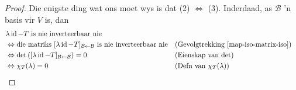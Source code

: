 \documentclass[a4paper,11pt]{book}
\theoremstyle{definition}
\newcommand{\basis}[1]{{\mathcal #1}}
\DeclareMathOperator{\id}{id}
\begin{document}
\begin{proof} Die enigste ding wat ons moet wys is dat (2)
	$\Leftrightarrow$ (3). Inderdaad, as $\basis{B}$ 'n basis vir $V$ is,
	dan
	\begin{align*}
		&\mbox{$\lambda \id - T$ is nie inverteerbaar nie} \\ &
		\Leftrightarrow
		\mbox{die matriks $[\lambda \id - T]_{\basis{B} \leftarrow
		\basis{B}}$ is nie inverteerbaar nie} && \mbox{(Gevolgtrekking
		\ref{map-iso-matrix-iso})} \\
		& \Leftrightarrow \det\left([\lambda \id - T]_{\basis{B} \leftarrow
		\basis{B}} \right) = 0 && \mbox{(Eienskap van $\det$)} \\
		& \Leftrightarrow \chi_T(\lambda) = 0 && \mbox{(Defn van
		$\chi_T(\lambda)$)}
	\end{align*}
\end{proof}
\end{document}
